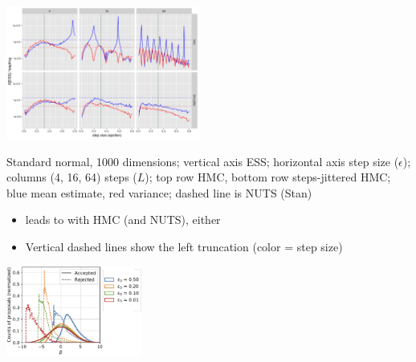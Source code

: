 \documentclass[10pt]{report}
\begin{document}
\begin{center}
  \vspace*{-4pt}
  \includegraphics[width=2.5in]{img/hmc-harmonics.png}
\end{center}
\begin{subitemize}
  \vspace*{-8pt}
\item Standard normal, 1000 dimensions; vertical axis
  ESS; horizontal axis step size ($\epsilon$); columns (4,
  16, 64) steps ($L$);
  top row HMC, bottom row steps-jittered HMC;
  blue mean estimate, red variance; dashed line is NUTS (Stan)
\end{subitemize}

\begin{itemize}
\item {} leads to 
  with HMC (and NUTS), either
  \item Vertical dashed lines show the left truncation (color = step size)
\end{itemize}
\begin{center}
  \includegraphics[width=1.75in]{img/hmc-rejections.png}
\end{center}
\end{document}
